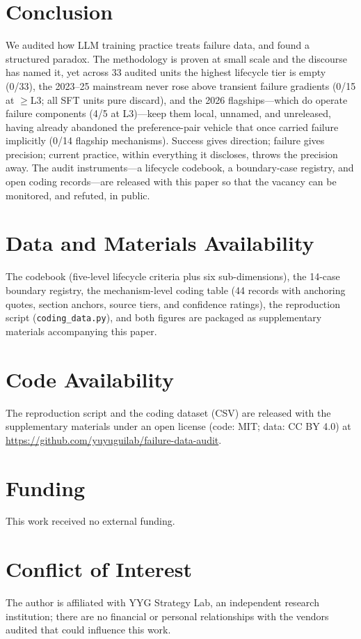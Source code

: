 \documentclass[10pt]{article}
\begin{document}
\section{Conclusion}\label{sec:conclusion}

We audited how LLM training practice treats failure data, and found a structured paradox. The methodology is proven at small scale and the discourse has named it, yet across 33 audited units the highest lifecycle tier is empty (0/33), the 2023--25 mainstream never rose above transient failure gradients (0/15 at $\ge$L3; all SFT units pure discard), and the 2026 flagships---which do operate failure components (4/5 at L3)---keep them local, unnamed, and unreleased, having already abandoned the preference-pair vehicle that once carried failure implicitly (0/14 flagship mechanisms). Success gives direction; failure gives precision; current practice, within everything it discloses, throws the precision away. The audit instruments---a lifecycle codebook, a boundary-case registry, and open coding records---are released with this paper so that the vacancy can be monitored, and refuted, in public.

\section*{Data and Materials Availability}

The codebook (five-level lifecycle criteria plus six sub-dimensions), the 14-case boundary registry, the mechanism-level coding table (44 records with anchoring quotes, section anchors, source tiers, and confidence ratings), the reproduction script (\texttt{coding\_data.py}), and both figures are packaged as supplementary materials accompanying this paper.

\section*{Code Availability}

The reproduction script and the coding dataset (CSV) are released with the supplementary materials under an open license (code: MIT; data: CC BY 4.0) at \url{https://github.com/yuyuguilab/failure-data-audit}.

\section*{Funding}

This work received no external funding.

\section*{Conflict of Interest}

The author is affiliated with YYG Strategy Lab, an independent research institution; there are no financial or personal relationships with the vendors audited that could influence this work.



\end{document}
